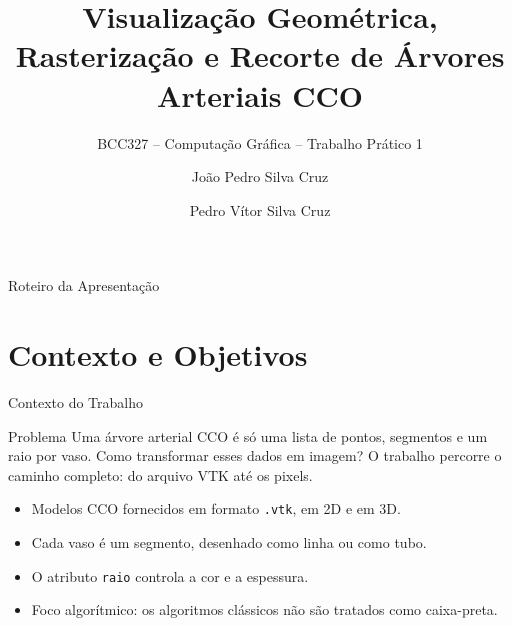 \documentclass[aspectratio=169,11pt]{beamer}
\title[Visualização CCO - Computação Gráfica]{Visualização Geométrica, Rasterização e Recorte de Árvores Arteriais CCO}
\subtitle{BCC327 -- Computação Gráfica -- Trabalho Prático 1}
\author{João Pedro Silva Cruz \and Pedro Vítor Silva Cruz}
\institute[UFOP]{Departamento de Computação (DECOM)\\Universidade Federal de Ouro Preto (UFOP)}
\begin{document}
\begin{frame}
  \titlepage
\end{frame}

\begin{frame}{Roteiro da Apresentação}
\tableofcontents
\end{frame}

\section{Contexto e Objetivos}

\begin{frame}{Contexto do Trabalho}
\begin{block}{Problema}
Uma árvore arterial CCO é só uma lista de pontos, segmentos e um raio por vaso. Como transformar esses dados em imagem? O trabalho percorre o caminho completo: do arquivo VTK até os pixels.
\end{block}

\vspace{0.25cm}

\begin{itemize}
  \item Modelos CCO fornecidos em formato \texttt{.vtk}, em 2D e em 3D.
  \item Cada vaso é um segmento, desenhado como linha ou como tubo.
  \item O atributo \texttt{raio} controla a cor e a espessura.
  \item Foco algorítmico: os algoritmos clássicos não são tratados como caixa-preta.
\end{itemize}
\end{frame}
\end{document}
